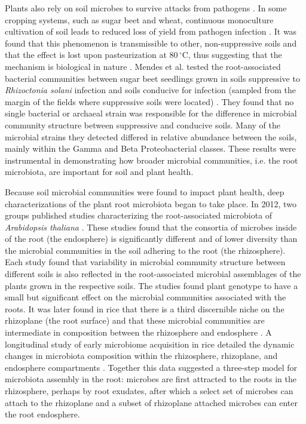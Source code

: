 Plants also rely on soil microbes to survive attacks from pathogens \cite{Berendsen2012,Bulgarelli2012}. In some cropping systems, such as sugar beet and wheat, continuous monoculture cultivation of soil leads to reduced loss of yield from pathogen infection \cite{Hornby1983}. It was found that this phenomenon is transmissible to other, non-suppressive soils and that the effect is lost upon pasteurization at $80\,^{\circ}\mathrm{C}$, thus suggesting that the mechanism is biological in nature \cite{Hornby1983}. Mendes et al. tested the root-associated bacterial communities between sugar beet seedlings grown in soils suppressive to \textit{Rhizoctonia solani} infection and soils conducive for infection (sampled from the margin of the fields where suppressive soils were located) \cite{Mendes2011}. They found that no single bacterial or archaeal strain was responsible for the difference in microbial community structure between suppressive and conducive soils. Many of the microbial strains they detected differed in relative abundance between the soils, mainly within the Gamma and Beta Proteobacterial classes. These results were instrumental in demonstrating how broader microbial communities, i.e. the root microbiota, are important for soil and plant health.

Because soil microbial communities were found to impact plant health, deep characterizations of the plant root microbiota began to take place. In 2012, two groups published studies characterizing the root-associated microbiota of \textit{Arabidopsis thaliana} \cite{Bulgarelli2012,Lundberg2012,}. These studies found that the consortia of microbes inside of the root (the endosphere) is significantly different and of lower diversity than the microbial communities in the soil adhering to the root (the rhizosphere). Each study found that variability in microbial community structure between different soils is also reflected in the root-associated microbial assemblages of the plants grown in the respective soils. The studies found plant genotype to have a small but significant effect on the microbial communities associated with the roots. It was later found in rice that there is a third discernible niche on the rhizoplane (the root surface) and that these microbial communities are intermediate in composition between the rhizosphere and endosphere \cite{Edwards2015}. A longitudinal study of early microbiome acquisition in rice detailed the dynamic changes in microbiota composition within the rhizosphere, rhizoplane, and endosphere compartments \cite{Edwards2015}. Together this data suggested a three-step model for microbiota assembly in the root: microbes are first attracted to the roots in the rhizosphere, perhaps by root exudates, after which a select set of microbes can attach to the rhizoplane and a subset of rhizoplane attached microbes can enter the root endosphere.

